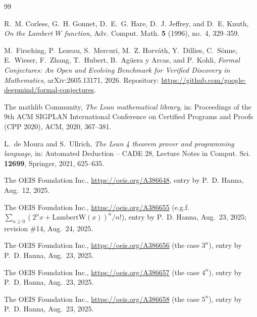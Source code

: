 \documentclass[11pt]{amsart}
\theoremstyle{plain}
\theoremstyle{definition}
\begin{document}
{\footnotesize
\begin{thebibliography}{99}

R.~M. Corless, G.~H. Gonnet, D.~E.~G. Hare, D.~J. Jeffrey, and D.~E. Knuth, \emph{On the Lambert $W$ function}, Adv. Comput. Math. \textbf{5} (1996), no.~4, 329--359.

M.~Firsching, P.~Lezeau, S.~Mercuri, M.~Z. Horv\'ath, Y.~Dillies, C.~S\"onne, E.~Wieser, F.~Zhang, T.~Hubert, B.~Ag\"uera y Arcas, and P.~Kohli, \emph{Formal Conjectures: An Open and Evolving Benchmark for Verified Discovery in Mathematics}, arXiv:2605.13171, 2026. Repository: \url{https://github.com/google-deepmind/formal-conjectures}.

The mathlib Community, \emph{The Lean mathematical library}, in: Proceedings of the 9th ACM SIGPLAN International Conference on Certified Programs and Proofs (CPP 2020), ACM, 2020, 367--381.

L.~de Moura and S.~Ullrich, \emph{The Lean 4 theorem prover and programming language}, in: Automated Deduction -- CADE 28, Lecture Notes in Comput. Sci. \textbf{12699}, Springer, 2021, 625--635.

The OEIS Foundation Inc., \url{https://oeis.org/A386648}, entry by P.~D. Hanna, Aug.~12, 2025.

The OEIS Foundation Inc., \url{https://oeis.org/A386655} (e.g.f.\ $\sum_{n\ge0}(2^nx+\mathrm{LambertW}(x))^n/n!$), entry by P.~D. Hanna, Aug.~23, 2025; revision \#14, Aug.~24, 2025.

The OEIS Foundation Inc., \url{https://oeis.org/A386656} (the case $3^n$), entry by P.~D. Hanna, Aug.~23, 2025.

The OEIS Foundation Inc., \url{https://oeis.org/A386657} (the case $4^n$), entry by P.~D. Hanna, Aug.~23, 2025.

The OEIS Foundation Inc., \url{https://oeis.org/A386658} (the case $5^n$), entry by P.~D. Hanna, Aug.~23, 2025.

\end{thebibliography}
}
\end{document}
